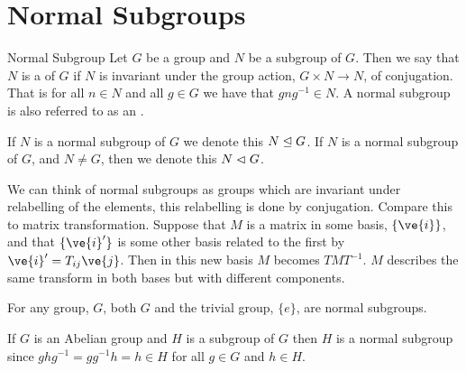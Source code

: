 \section{Normal Subgroups}
\begin{dfn}{Normal Subgroup}{}
    Let \(G\) be a group and \(N\) be a subgroup of \(G\).
    Then we say that \(N\) is a  of \(G\) if \(N\) is invariant under the group action, \(G \times N \to N\), of conjugation.
    That is for all \(n \in N\) and all \(g \in G\) we have that \(g n g^{-1} \in N\).
    A normal subgroup is also referred to as an .
    
    \begin{ntn}{}{}
        If \(N\) is a normal subgroup of \(G\) we denote this \(N \trianglelefteq G\).
        If \(N\) is a normal subgroup of \(G\), and \(N \ne G\), then we denote this \(N \vartriangleleft G\).
    \end{ntn}
\end{dfn}

We can think of normal subgroups as groups which are invariant under relabelling of the elements, this relabelling is done by conjugation.
Compare this to matrix transformation.
Suppose that \(M\) is a matrix in some basis, \(\{\ve{i}\}\), and that \(\{\ve{i}'\}\) is some other basis related to the first by \(\ve{i}' = T_{ij}\ve{j}\).
Then in this new basis \(M\) becomes \(TMT^{-1}\).
\(M\) describes the same transform in both bases but with different components.

\begin{exm}{}{}
    For any group, \(G\), both \(G\) and the trivial group, \(\{e\}\), are normal subgroups.
    
    If \(G\) is an Abelian group and \(H\) is a subgroup of \(G\) then \(H\) is a normal subgroup since \(ghg^{-1} = gg^{-1}h = h \in H\) for all \(g \in G\) and \(h \in H\).
\end{exm}

